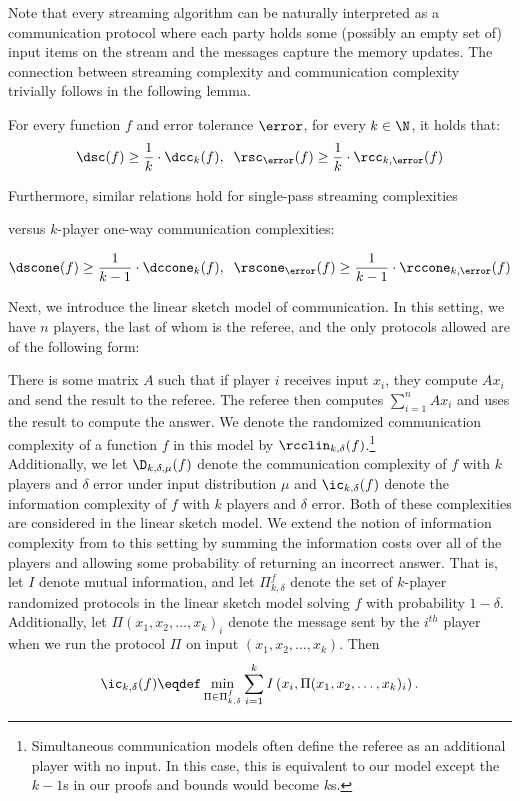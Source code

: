 Note that every streaming algorithm can be naturally interpreted as a communication protocol where each party holds some (possibly an empty set of) input items on the stream and the messages capture the memory updates.
The connection between streaming complexity and communication complexity trivially follows 
in the following lemma.

\begin{lemma}\label{lemma:sc-cc}
For every function $f$ and error tolerance $\error$, 
for every $k\in\N$, it holds that: 
\[\dsc(f)\ge \frac{1}{k} \cdot \dcc_{k}(f),\;\;
\rsc_{\error}(f)\ge \frac{1}{k} \cdot \rcc_{k,\error}(f)\]

Furthermore, similar relations hold for 
 single-pass streaming complexities 

versus
 $k$-player one-way communication complexities: 

\[\dscone(f)\ge \frac{1}{k-1} \cdot \dccone_{k}(f),\;\;
\rscone_{\error}(f)\ge \frac{1}{k-1} \cdot \rccone_{k,\error}(f)\]

\end{lemma}

Next, we introduce the linear sketch model of communication. In this setting, we have $n$ players, {\color{black}the last of whom is the referee,} and the only protocols allowed are of the following form:

There is some matrix $A$ such that if player $i$ receives input $x_i$, they compute $Ax_i$ and send the result to the referee. The referee then computes $\sum_{i=1}^n Ax_i$ and uses the result to compute the answer. We denote the randomized communication complexity of a function $f$ in this model by $\rcclin_{k,\delta}(f)$.\footnote{Simultaneous communication models often define the referee as an additional player with no input. In this case, this is equivalent to our model except the $k-1$s in our proofs and bounds would become $k$s.}\\

Additionally, we let $\D_{k,\delta,\mu}(f)$ denote the communication complexity of $f$ with $k$ players and $\delta$ error under input distribution $\mu$ and $\ic_{k,\delta}(f)$ denote the information complexity of $f$ with $k$ players and $\delta$ error. {\color{black}Both of these complexities are considered in the linear sketch model.} We extend the notion of information complexity from \cite{959901} to this setting by summing the information costs over all of the players and allowing some probability of returning an incorrect answer. {\color{black}That is, let $I$ denote mutual information, and let $\Pi^{f}_{k,\delta}$ denote the set of $k$-player randomized protocols in the linear sketch model solving $f$ with probability $1-\delta$. Additionally, let $\Pi(x_1, x_2, \dots, x_k)_i$ denote the message sent by the $i^{th}$ player when we run the protocol $\Pi$ on input $(x_1, x_2, \dots, x_k)$. Then
$$\ic_{k,\delta}(f) \eqdef \min_{\Pi \in \Pi^f_{k,\delta}} \sum_{i=1}^k I\left(x_i, \Pi(x_1, x_2, \dots, x_k)_i\right).$$}

